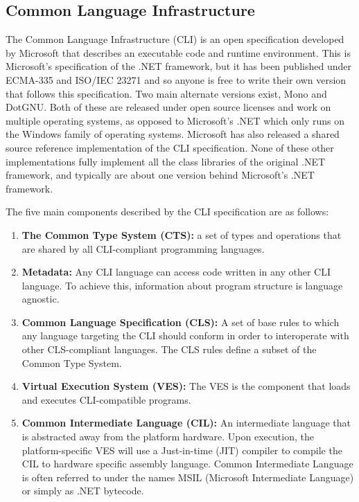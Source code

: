 \subsection{Common Language Infrastructure}

	The Common Language Infrastructure (CLI) is an open specification developed by
	Microsoft that describes an executable code and runtime environment. This is 
	Microsoft's specification of the .NET framework, but it has been published 
	under ECMA-335 and ISO/IEC 23271 and so anyone is free to write their own 
	version that follows this specification. Two main alternate versions exist, 
	Mono and DotGNU. Both of these are released under open source licenses and 
	work on multiple operating systems, as opposed to Microsoft's .NET which only 
	runs on the Windows family of operating systems. Microsoft has also released a 
	shared source reference implementation of the CLI specification. None of these 
	other implementations fully implement all the class libraries of the original 
	.NET framework, and typically are about one version behind Microsoft's .NET 
	framework.

	The five main components described by the CLI specification are as follows:

	\begin{enumerate}
		
		\item \textbf{The Common Type System (CTS):} a set of types and operations 
		that are shared by all CLI-compliant programming languages.
		
		\item \textbf{Metadata:} Any CLI language can access code written in any 
		other CLI language. To achieve this, information about program structure is 
		language agnostic.
	
		\item \textbf{Common Language Specification (CLS):} A set of base rules to 
		which any language targeting the CLI should conform in order to interoperate 
		with other CLS-compliant languages. The CLS rules define a subset of the 
		Common Type System.
	
		\item \textbf{Virtual Execution System (VES):} The VES is the component that
		loads and executes CLI-compatible programs. 
	
		\item \textbf{Common Intermediate Language (CIL):} An intermediate language 
		that is abstracted away from the platform hardware. Upon execution, the 
		platform-specific VES will use a Just-in-time (JIT) compiler to compile the 
		CIL to hardware specific assembly language. Common Intermediate Language is 
		often referred to under the names MSIL (Microsoft Intermediate Language) or 
		simply as .NET bytecode.

	\end{enumerate}
    
